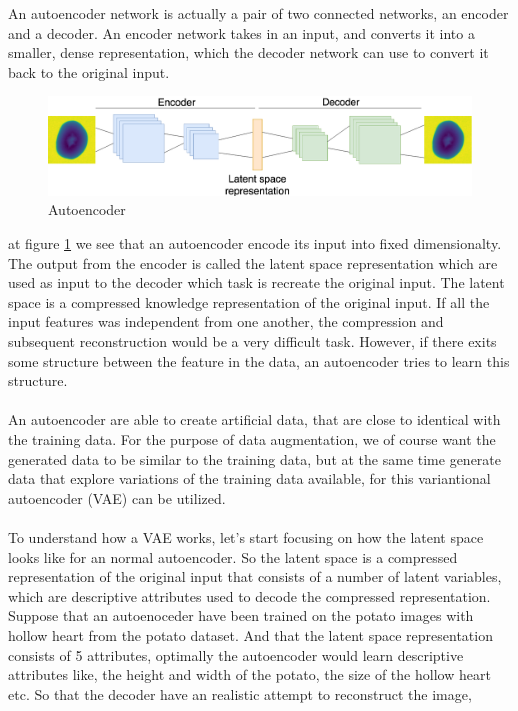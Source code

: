 \documentclass[11pt]{article}
\begin{document}
An autoencoder network is actually a pair of two connected networks, an encoder and a decoder. An encoder network takes in an input, and converts it into a smaller, dense representation, which the decoder network can use to convert it back to the original input.
\begin{figure}[!h]
    \centering
    \includegraphics[width=1.0\textwidth]{figurer/autoencoder.png}
    \caption{Autoencoder}
    \label{fig:autoencoder}
\end{figure}
at figure \ref{fig:autoencoder} we see that an autoencoder encode its input into fixed dimensionalty. The output from the encoder is called the latent space representation which are used as input to the decoder which task is recreate the original input. The latent space is a compressed knowledge representation of the original input. If all the input features was independent from one another, the compression and subsequent reconstruction would be a very difficult task. However, if there exits some structure between the feature in the data, an autoencoder tries to learn this structure.
\\ \\
An autoencoder are able to create artificial data, that are close to identical with the training data. For the purpose of data augmentation, we of course want the generated data to be similar to the training data, but at the same time generate data that explore variations of the training data available, for this variantional autoencoder (VAE) can be utilized. 
\\ \\
To understand how a VAE works, let's start focusing on how the latent space looks like for an normal autoencoder. So the latent space is a compressed representation of the original input that consists of a number of latent variables, which are descriptive attributes used to decode the compressed representation. Suppose
that an autoenoceder have been trained on the potato images with hollow heart from the potato dataset. And that the latent space representation consists of 5 attributes, optimally the autoencoder would learn descriptive attributes like, the height and width of the potato, the size of the hollow heart etc. So that the decoder have an realistic attempt to reconstruct the image,
\end{document}
